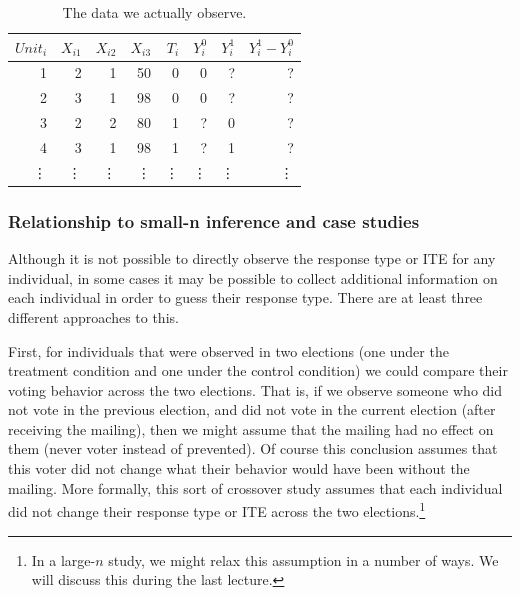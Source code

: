\documentclass{article}
\begin{document}
\begin{table}
\begin{center}
\caption{\label{t:real} The data we actually observe.}
\begin{tabular}{r|rrr|r|r|r|r}
$Unit_i$ & $X_{i1}$ & $X_{i2}$ & $X_{i3}$ & $T_i $ & $Y_i^0$ & $Y_i^1$ & $Y_i^1-Y_i^0$ \\
\hline
1 & 2 & 1 & 50 & 0 & 0 & ? & ? \\ 
2 & 3 & 1 & 98 & 0 & 0 & ? & ? \\ 
3 & 2 & 2 & 80 & 1 & ? & 0 & ? \\ 
4 & 3 & 1 & 98 & 1 & ? & 1 & ?\\
\vdots &  \vdots &\vdots &\vdots &\vdots &\vdots &\vdots & \vdots  \\
\end{tabular}
\end{center}
\end{table}




\subsubsection{Relationship to small-n inference and case studies}

Although it is not possible to directly observe the response type or ITE for any individual, in some cases it may be possible to collect additional information on each individual in order to guess their response type. There are at least three different approaches to this.

First, for individuals that were observed in two elections (one under the treatment condition and one under the control condition) we could compare their voting behavior across the two elections. That is, if we observe someone who did not vote in the previous election, and did not vote in the current election (after receiving the mailing), then we might assume that the mailing had no effect on them (never voter instead of prevented). Of course this conclusion assumes that this voter did not change what their behavior would have been without the mailing. More formally, this sort of crossover study assumes that each individual did not change their response type or ITE across the two elections.\footnote{In a large-$n$ study, we might relax this assumption in a number of ways. We will discuss this during the last lecture.} 
\end{document}
